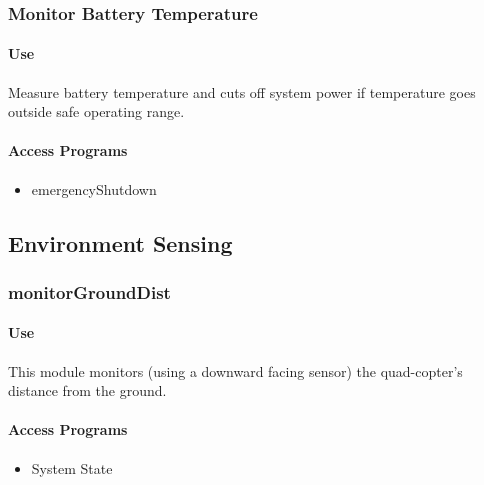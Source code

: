 \documentclass[10pt,letterpaper]{article}
\begin{document}
\subsubsection{Monitor Battery Temperature}
\paragraph{Use}
Measure battery temperature and cuts off system power if temperature goes outside safe operating range.
\paragraph{Access Programs}
\begin{itemize}
\item emergencyShutdown
\end{itemize}
\begin{table}[H]
  \caption{monitorBatT}
\end{table}

\newpage

\subsection{Environment Sensing}


\subsubsection{monitorGroundDist}
\paragraph{Use}
This module monitors (using a downward facing sensor) the quad-copter's distance from the ground.
\paragraph{Access Programs}
\begin{itemize}
	\item System State
\end{itemize}
\begin{table}[H]
  \caption{monitorGroundDist}
\end{table}
\end{document}
